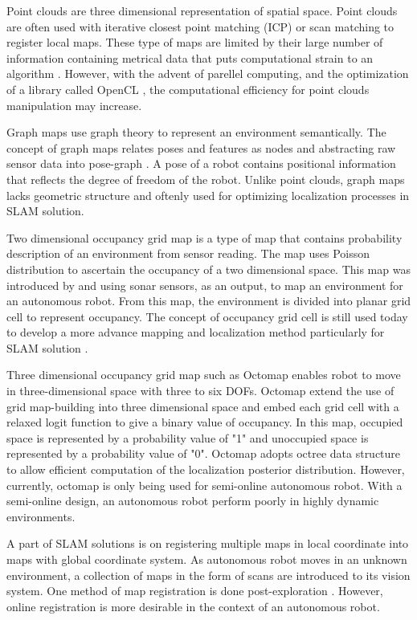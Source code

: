 \documentclass[a4paper,10pt]{article}
\begin{document}
Point clouds are three dimensional representation of spatial space. 
Point clouds are
often used with iterative closest point matching (ICP) or scan matching to
register local maps. These type of maps are limited by their large number of
information containing metrical data that puts computational strain to an
algorithm \citep{Olson2009}. However, with the advent of parellel computing,
and the optimization of a library called OpenCL \citep{Rusu2011}, the
computational efficiency for point clouds manipulation may increase.

Graph maps use graph theory to represent an environment semantically. The
concept of graph maps relates poses and features as nodes and abstracting raw
sensor data into pose-graph \citep{Grisetti2010}. A pose of a robot contains
positional information that reflects the degree of freedom of the robot.
Unlike point clouds, graph
maps lacks geometric structure and oftenly used for optimizing localization
processes in SLAM solution.

Two dimensional occupancy grid map is a type of map that contains probability description of an
environment from sensor reading. The map uses Poisson distribution to ascertain
the occupancy of a two dimensional space. This map was introduced by \citet{Moravec1988} and
\citet{Elfes1989} using sonar sensors, as an output, to map an environment for
an autonomous robot. From this map, the environment is divided into planar grid
cell to represent occupancy. The concept of occupancy grid cell is still used
today to develop a more advance mapping and localization method particularly for
SLAM solution \citep{Ray2012,Birk2006}. 

Three dimensional occupancy grid map such as Octomap \citep{Hornung2013} enables
robot to move in three-dimensional space with three to six DOFs. Octomap extend
the use of grid map-building into three dimensional space and embed each grid
cell with a relaxed logit function to give a binary value of occupancy. In this
map, occupied space is represented by a probability value of "1" and unoccupied
space is represented by a probability value of "0". Octomap adopts octree data
structure to allow efficient computation of the localization posterior
distribution. However, currently, octomap is only being used for semi-online
autonomous robot. With a semi-online design, an autonomous robot perform poorly
in highly dynamic environments. 

A part of SLAM solutions is on
registering multiple maps in local coordinate into maps with global coordinate
system. As autonomous robot moves in an unknown environment, a collection of
maps in the form of scans are introduced to its vision system. One method of
map registration is done post-exploration \citep{Burgard1999}. However, online
registration is more desirable in the context of an autonomous robot.  




\end{document}

